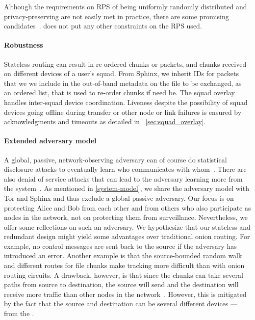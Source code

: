 Although the requirements on \ac{RPS} of being uniformly randomly
distributed and privacy-preserving are not easily met in practice,
there are some promising candidates~\cite{Octopus, BrahmsRPS}.\name
does not put any other constraints on the \ac{RPS} used.

\paragraph*{Robustness}

Stateless routing can result in re-ordered chunks or packets, and
chunks received on different devices of a user's squad. From Sphinx,
we inherit IDs for packets that we we include in the out-of-band
metadata on the file to be exchanged, as an ordered list, that is used
to re-order chunks if need be. The squad overlay handles inter-squad
device coordination. Liveness despite the possibility of squad devices
going offline during transfer or other node or link failures is
ensured by acknowledgments and timeouts as detailed in
~\cref{sec:squad_overlay}.


\paragraph*{Extended adversary model}%
\label{security-limitations}

A global, passive, network-observing adversary can of course do
statistical disclosure attacks to eventually learn who communicates
with whom~\cite{StatisticalDisclosureAttacks}.   There are also denial
of service attacks that can lead to the adversary learning more from
the system~\cite{DenialOfSecurity}.  As mentioned in
\cref{system-model}, we share the adversary model with Tor and Sphinx
and thus exclude a global passive adversary. Our focus is on
protecting Alice and Bob from each other and from others who also
participate as nodes in the network, not on protecting them from
surveillance. Nevertheless, we offer some reflections on such an
adversary. We hypothesize that our stateless and redundant design
might yield some advantages over traditional onion routing. For
example, no control messages are sent back to the source if the
adversary has introduced an error.     Another example is that the source-bounded
random walk and different routes for file chunks make tracking more
difficult than with onion routing circuits. A drawback, however, is
that since the chunks can take several paths from source to destination, the source 
will send and the destination will receive more traffic than other nodes in the 
network~\cite{RoutingSurveyAnonymousProtocols}. However, this is mitigated by the fact that the source and 
destination can be several different devices --- \ie from the \squads.


